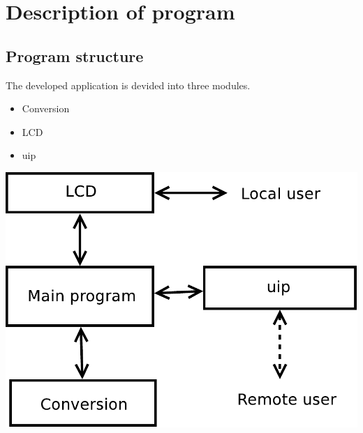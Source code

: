 \chapter[Description]{Description of program}
\label{chap:description}

\section{Program structure}
The developed application is devided into three modules.
\begin{itemize}
\item Conversion
\item LCD
\item uip
\end{itemize}
\begin{center}
\includegraphics[scale=0.4]{figs/program_structure.pdf}
\end{center}

